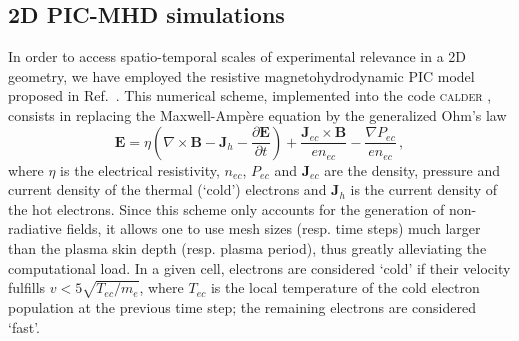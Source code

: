 \documentclass[aps,twocolumn,showpacs,superscriptaddress]{revtex4}
\begin{document}
\subsection*{2D PIC-MHD simulations}

In order to access spatio-temporal scales of experimental relevance in a 2D geometry, we have employed the resistive magnetohydrodynamic PIC model proposed in
\mbox{Ref.~\cite{JCP_Cohen_2010}}. This numerical scheme, implemented into the code \textsc{calder} \cite{NF_Lefebvre_2003}, consists in replacing the Maxwell-Amp\`ere equation
by the generalized Ohm's law
\begin{equation} \label{eq:PICMHD}
  \mathbf{E}=\eta \left(\nabla \times \mathbf{B}-\mathbf{J}_{h}-\frac{\partial \mathbf{E}}{\partial t}\right)+\frac{\mathbf{J}_{ec}\times \mathbf{B}}{en_{ec}}
  -\frac{\nabla P_{ec}}{en_{ec}} \,,
\end{equation}
where $\eta$ is the electrical resistivity, $n_{ec}$, $P_{ec}$ and $\mathbf{J}_{ec}$ are the density, pressure and current density of the thermal (`cold') electrons and $\mathbf{J}_h$ is the current density of the hot electrons. Since this scheme only accounts for the generation of non-radiative fields, it allows one to use mesh sizes (resp. time steps) much larger than the plasma skin depth (resp. plasma period), thus greatly alleviating the computational load. In a given cell, electrons are considered `cold' if their velocity fulfills $v<5\sqrt{T_{ec}/m_e}$, where $T_{ec}$ is the local temperature of the cold electron population
at the previous time step; the remaining electrons are considered `fast'.
\end{document}
